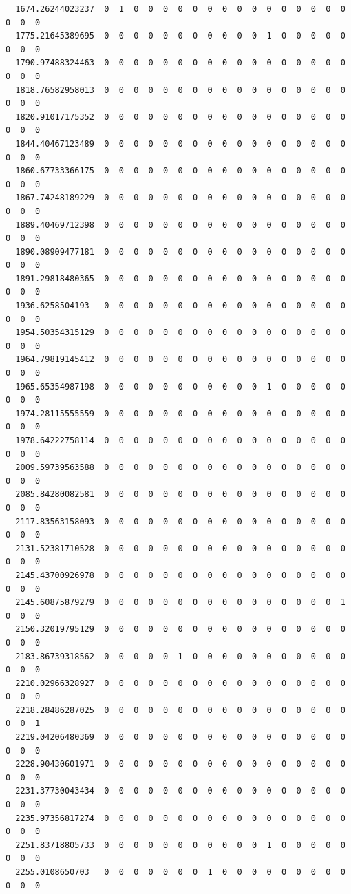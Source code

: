 \documentclass[
  letterpaper,
  DIV=11,
  numbers=noendperiod]{scrartcl}
\begin{document}
\begin{verbatim}
  1674.26244023237  0  1  0  0  0  0  0  0  0  0  0  0  0  0  0  0  0  0  0  0
  1775.21645389695  0  0  0  0  0  0  0  0  0  0  0  1  0  0  0  0  0  0  0  0
  1790.97488324463  0  0  0  0  0  0  0  0  0  0  0  0  0  0  0  0  0  0  0  0
  1818.76582958013  0  0  0  0  0  0  0  0  0  0  0  0  0  0  0  0  0  0  0  0
  1820.91017175352  0  0  0  0  0  0  0  0  0  0  0  0  0  0  0  0  0  0  0  0
  1844.40467123489  0  0  0  0  0  0  0  0  0  0  0  0  0  0  0  0  0  0  0  0
  1860.67733366175  0  0  0  0  0  0  0  0  0  0  0  0  0  0  0  0  0  0  0  0
  1867.74248189229  0  0  0  0  0  0  0  0  0  0  0  0  0  0  0  0  0  0  0  0
  1889.40469712398  0  0  0  0  0  0  0  0  0  0  0  0  0  0  0  0  0  0  0  0
  1890.08909477181  0  0  0  0  0  0  0  0  0  0  0  0  0  0  0  0  0  0  0  0
  1891.29818480365  0  0  0  0  0  0  0  0  0  0  0  0  0  0  0  0  0  0  0  0
  1936.6258504193   0  0  0  0  0  0  0  0  0  0  0  0  0  0  0  0  0  0  0  0
  1954.50354315129  0  0  0  0  0  0  0  0  0  0  0  0  0  0  0  0  0  0  0  0
  1964.79819145412  0  0  0  0  0  0  0  0  0  0  0  0  0  0  0  0  0  0  0  0
  1965.65354987198  0  0  0  0  0  0  0  0  0  0  0  1  0  0  0  0  0  0  0  0
  1974.28115555559  0  0  0  0  0  0  0  0  0  0  0  0  0  0  0  0  0  0  0  0
  1978.64222758114  0  0  0  0  0  0  0  0  0  0  0  0  0  0  0  0  0  0  0  0
  2009.59739563588  0  0  0  0  0  0  0  0  0  0  0  0  0  0  0  0  0  0  0  0
  2085.84280082581  0  0  0  0  0  0  0  0  0  0  0  0  0  0  0  0  0  0  0  0
  2117.83563158093  0  0  0  0  0  0  0  0  0  0  0  0  0  0  0  0  0  0  0  0
  2131.52381710528  0  0  0  0  0  0  0  0  0  0  0  0  0  0  0  0  0  0  0  0
  2145.43700926978  0  0  0  0  0  0  0  0  0  0  0  0  0  0  0  0  0  0  0  0
  2145.60875879279  0  0  0  0  0  0  0  0  0  0  0  0  0  0  0  0  1  0  0  0
  2150.32019795129  0  0  0  0  0  0  0  0  0  0  0  0  0  0  0  0  0  0  0  0
  2183.86739318562  0  0  0  0  0  1  0  0  0  0  0  0  0  0  0  0  0  0  0  0
  2210.02966328927  0  0  0  0  0  0  0  0  0  0  0  0  0  0  0  0  0  0  0  0
  2218.28486287025  0  0  0  0  0  0  0  0  0  0  0  0  0  0  0  0  0  0  0  1
  2219.04206480369  0  0  0  0  0  0  0  0  0  0  0  0  0  0  0  0  0  0  0  0
  2228.90430601971  0  0  0  0  0  0  0  0  0  0  0  0  0  0  0  0  0  0  0  0
  2231.37730043434  0  0  0  0  0  0  0  0  0  0  0  0  0  0  0  0  0  0  0  0
  2235.97356817274  0  0  0  0  0  0  0  0  0  0  0  0  0  0  0  0  0  0  0  0
  2251.83718805733  0  0  0  0  0  0  0  0  0  0  0  1  0  0  0  0  0  0  0  0
  2255.0108650703   0  0  0  0  0  0  0  1  0  0  0  0  0  0  0  0  0  0  0  0

\end{verbatim}
\end{document}
